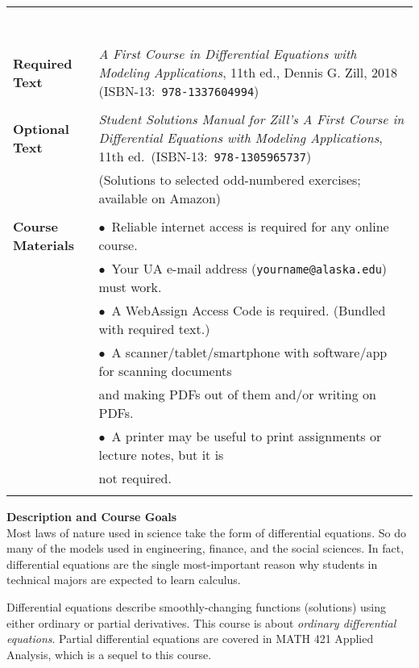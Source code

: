 \documentclass[12pt]{article}
\renewcommand{\emph}[1]{\textsf{\textbf{#1}}}
\newcommand{\localhead}[1]{\par\smallskip\textbf{#1}\nobreak\\}%
\def\heading#1{\localhead{\large\emph{#1}}}
\begin{document}
\begin{tabularx}{\textwidth}{lX}
\begin{tabular}[t]{ll}
                  \end{tabular} \\
 & \\
\emph{Required Text}     & \textsl{A First Course in Differential Equations with Modeling Applications}, 11th ed., Dennis G. Zill, 2018 (ISBN-13:\, \texttt{978-1337604994}) \\
 & \\
\emph{Optional Text}     & \textit{Student Solutions Manual for Zill's A First Course in Differential Equations with Modeling Applications}, 11th ed.~(ISBN-13:\, \texttt{978-1305965737}) \\
    & (Solutions to selected odd-numbered exercises; available on Amazon) \\
 & \\
\emph{Course Materials}  & $\bullet$\, Reliable internet access is required for any online course. \\
                         & $\bullet$\, Your UA e-mail address (\texttt{yourname@alaska.edu}) must work. \\
                         & $\bullet$\, A WebAssign Access Code is required.  (Bundled with required text.) \\
                         & $\bullet$\, A scanner/tablet/smartphone with software/app for scanning documents \\
                         & \quad and making PDFs out of them and/or writing on PDFs. \\
                         & $\bullet$\, A printer may be useful to print assignments or lecture notes, but it is \\
                         & \quad not required. \\
 & 
\end{tabularx}

\vfill

\newpage
\cfoot{\thepage}
\strut

\heading{Description and Course Goals}
Most laws of nature used in science take the form of differential equations.  So do many of the models used in engineering, finance, and the social sciences.  In fact, differential equations are the single most-important reason why students in technical majors are expected to learn calculus.

Differential equations describe smoothly-changing functions (solutions) using either ordinary or partial derivatives.  This course is about \textsl{ordinary differential equations}.  Partial differential equations are covered in MATH 421 Applied Analysis, which is a sequel to this course.
\end{document}
